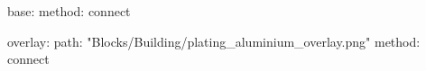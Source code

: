 base:
  method: connect

overlay:
  path: "Blocks/Building/plating_aluminium_overlay.png"
  method: connect

